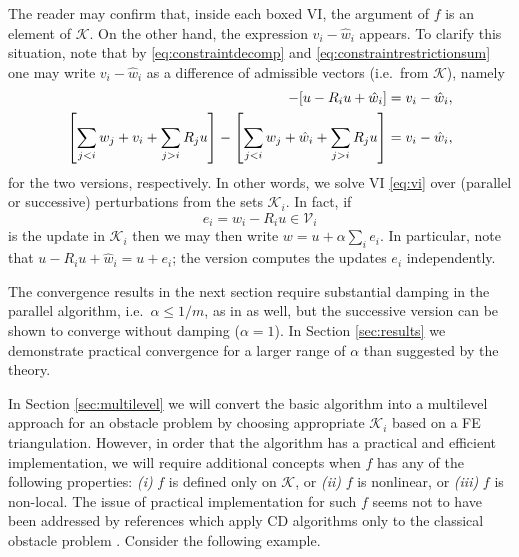 \documentclass[letterpaper,final,12pt,reqno]{amsart}
\theoremstyle{cstyle}
\theoremstyle{cstyle*}
\theoremstyle{dstyle}
\numberwithin{equation}{section}
\numberwithin{figure}{section}
\numberwithin{table}{section}
\numberwithin{theorem}{section}
\newcommand{\cK}{\mathcal{K}}
\newcommand{\cV}{\mathcal{V}}
\begin{document}
The reader may confirm that, inside each boxed VI, the argument of $f$ is an element of $\cK$.  On the other hand, the expression $v_i - \hat w_i$ appears.  To clarify this situation, note that by \eqref{eq:constraintdecomp} and \eqref{eq:constraintrestrictionsum} one may write $v_i - \hat w_i$ as a difference of admissible vectors (i.e.~from $\cK$), namely
\begin{align*}
[u - R_i u + v_i] - [u - R_i u + \hat w_i] &= v_i - \hat w_i, \label{eq:admissibledifference} \\
\left[\sum_{j<i} w_j + v_i + \sum_{j>i} R_j u\right] - \left[\sum_{j<i} w_j + \hat w_i + \sum_{j>i} R_j u\right] &= v_i - \hat w_i,  \notag
\end{align*}
for the two versions, respectively.  In other words, we solve VI \eqref{eq:vi} over (parallel or successive) perturbations from the sets $\cK_i$.  In fact, if
\begin{equation}
e_i = \hat w_i - R_i u \in \cV_i \label{eq:ithupdate}
\end{equation}
is the update in $\cK_i$ then we may then write $w = u + \alpha \sum_i e_i$.  In particular, note that $u - R_i u + \hat w_i = u + e_i$; the  version computes the updates $e_i$ independently.

The convergence results in the next section require substantial damping in the parallel algorithm, i.e.~$\alpha \le 1/m$, as in \cite{Tai2003} as well, but the successive version can be shown to converge without damping ($\alpha=1$).  In Section \ref{sec:results} we demonstrate practical convergence for a larger range of $\alpha$ than suggested by the theory.  %

In Section \ref{sec:multilevel} we will convert the basic algorithm into a multilevel approach for an obstacle problem by choosing appropriate $\cK_i$ based on a FE triangulation.  However, in order that the algorithm has a practical and efficient implementation, we will require additional concepts when $f$ has any of the following properties: \emph{(i)} $f$ is defined only on $\cK$, or \emph{(ii)} $f$ is nonlinear, or \emph{(iii)} $f$ is non-local.  The issue of practical implementation for such $f$ seems not to have been addressed by references which apply CD algorithms only to the classical obstacle problem \cite[in particular]{GraeserKornhuber2009,Tai2003}.  Consider the following example.
\end{document}
